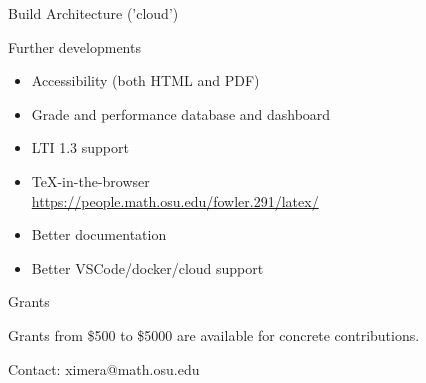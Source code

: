 \begin{frame}[t]{Build Architecture ('cloud')}
\begin{center}
{
  }
\end{center}
\end{frame}

\begin{frame}{Further developments}

  \begin{itemize}[<+->]
  \item Accessibility  (both HTML and PDF)
  \item Grade and performance database and dashboard
  \item LTI 1.3 support
  \item TeX-in-the-browser \\ \url{https://people.math.osu.edu/fowler.291/latex/}
  \item Better documentation
  \item Better VSCode/docker/cloud support
  \end{itemize}

\end{frame}

\begin{frame}{Grants}

  Grants from \$500 to \$5000 are available for concrete contributions.
  
  Contact: ximera@math.osu.edu

\end{frame}

